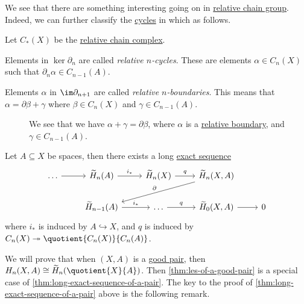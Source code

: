 We see that there are something interesting going on in \hyperref[def:relative-chain-group]{relative chain group}. Indeed, we can further classify the
\hyperref[def:cycle]{cycles} in which as follows.
\begin{definition*}
	Let \(C_\ast(X)\) be the \hyperref[def:relative-chain-complex]{relative chain complex}.
	\begin{definition}\label{def:relative-cycle}
		Elements in \(\ker \partial_n\) are called \emph{relative \(n\)-cycles}. These are elements \(\alpha \in C_n(X)\)
		such that \(\partial_n\alpha \in C_{n - 1}(A)\).
		\begin{figure}[H]
			\centering
			\label{fig:def:relative-homology-1}
		\end{figure}
	\end{definition}
	\begin{definition}\label{def:relative-boundary}
		Elements \(\alpha\) in \(\im \partial_{n + 1}\) are called \emph{relative \(n\)-boundaries}. This means that
		\(\alpha = \partial \beta + \gamma\) where \(\beta \in C_n(X)\) and \(\gamma \in C_{n - 1}(A)\).
		\begin{figure}[H]
			\centering
			\caption{We see that we have \(\alpha +\gamma =\partial \beta \), where \(\alpha \) is a \hyperref[def:relative-boundary]{relative boundary},
				and \(\gamma \in C_{n-1}(A)\).}
			\label{fig:def:relative-homology-2}
		\end{figure}
	\end{definition}
\end{definition*}

\begin{theorem}\label{thm:long-exact-sequence-of-a-pair}
	Let \(A \subseteq X\) be spaces, then there exists a long \hyperref[def:exact-sequence]{exact sequence}
	\[
		\begin{tikzcd}
			{\dots} & {\widetilde{H}_n(A)} & {\widetilde{H}_n(X)} & {\widetilde{H}_n(X, A)} \\
			& {\widetilde{H}_{n-1}(A)} & \dots & {\widetilde{H}_{0}(X, A)} & 0
			\arrow[from=1-1, to=1-2]
			\arrow["{i_\ast}", from=1-2, to=1-3]
			\arrow["q", from=1-3, to=1-4]
			\arrow[from=2-4, to=2-5]
			\arrow["{q}", from=2-3, to=2-4]
			\arrow["{i_\ast}", from=2-2, to=2-3]
			\arrow["{\partial}"', from=1-4, to=2-2]
		\end{tikzcd}
	\]
	where \(i_\ast\) is induced by \(A\hookrightarrow X\), and \(q\) is induced by \(C_{n} (X)\twoheadrightarrow \quotient{C_{n} (X)}{C_{n} (A)}\).
\end{theorem}
We will prove that when \((X, A)\) is a \hyperref[def:good-pair]{good pair}, then \(H_n(X, A) \cong \widetilde{H}_n(\quotient{X}{A})\). Then \autoref{thm:les-of-a-good-pair}
is a special case of \autoref{thm:long-exact-sequence-of-a-pair}. The key to the proof of \autoref{thm:long-exact-sequence-of-a-pair} above is the following remark.

